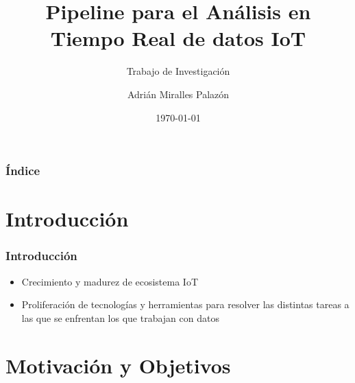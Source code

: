 \documentclass[12pt]{beamer}
\begin{document}
        \title[Pipeline Análisis IoT]{
            Pipeline para el Análisis en  \\
            Tiempo Real de datos IoT }
        \subtitle{Trabajo de Investigación}
        

        \author{Adrián Miralles Palazón}
        \date{\today}

        \maketitle

        \begin{frame}
            \frametitle{Índice}
            \tableofcontents
        \end{frame}

        \section{Introducción}

        \begin{frame}
            \frametitle{Introducción}

            \begin{itemize}
                \item Crecimiento y madurez de ecosistema IoT
                \item Proliferación de tecnologías y herramientas para resolver las distintas tareas a las que se enfrentan los que trabajan con datos
            \end{itemize}
        \end{frame}

        \section{Motivación y Objetivos}
\end{document}
